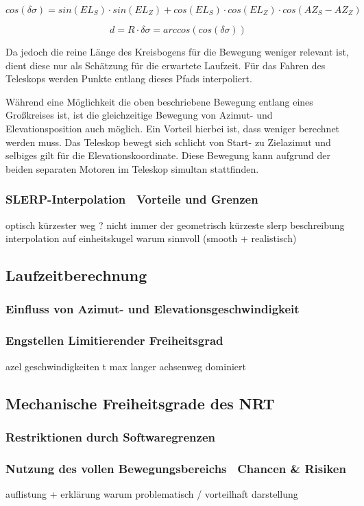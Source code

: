 \begin{equation}
    cos(\delta \sigma) = sin(EL_S) \cdot sin(EL_Z) + cos(EL_S) \cdot cos(EL_Z) \cdot cos(AZ_S - AZ_Z)
    \label{Winkelentfernung}
\end{equation}

\begin{equation}
    d = R \cdot \delta \sigma = arccos(cos(\delta \sigma))
    \label{Großkreisbogenlängenformel}
\end{equation}

Da jedoch die reine Länge des Kreisbogens für die Bewegung weniger relevant ist, dient diese nur als Schätzung für die erwartete Laufzeit. Für das Fahren des Teleskops werden Punkte entlang dieses Pfads interpoliert.

Während eine Möglichkeit die oben beschriebene Bewegung entlang eines Großkreises ist, ist die gleichzeitige Bewegung von Azimut- und Elevationsposition auch möglich. Ein Vorteil hierbei ist, dass weniger berechnet werden muss. Das Teleskop bewegt sich schlicht von Start- zu Zielazimut und selbiges gilt für die Elevationskoordinate. Diese Bewegung kann aufgrund der beiden separaten Motoren im Teleskop simultan stattfinden.

\subsubsection{SLERP-Interpolation \textendash~Vorteile und Grenzen}

optisch kürzester weg ? nicht immer der geometrisch kürzeste
slerp beschreibung
interpolation auf einheitskugel
warum sinnvoll (smooth + realistisch)






\subsection{Laufzeitberechnung}

\subsubsection{Einfluss von Azimut- und Elevationsgeschwindigkeit}
\subsubsection{Engstellen \textendash Limitierender Freiheitsgrad}

azel geschwindigkeiten
t max
langer achsenweg dominiert

\subsection{Mechanische Freiheitsgrade des NRT}

\subsubsection{Restriktionen durch Softwaregrenzen}
\subsubsection{Nutzung des vollen Bewegungsbereichs \textendash~Chancen \& Risiken}

auflistung + erklärung warum problematisch / vorteilhaft
darstellung

